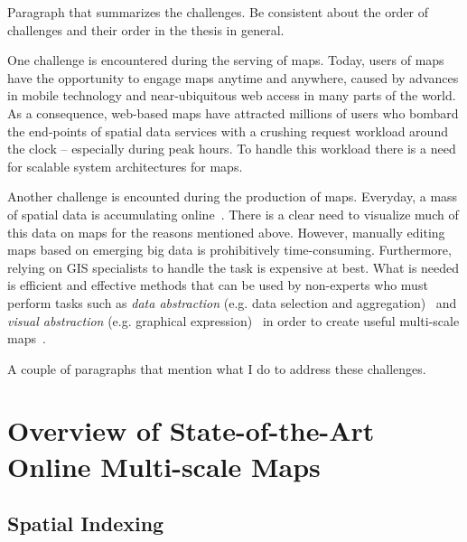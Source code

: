 \documentclass[11pt, oneside]{report}   	%
\begin{document}
Paragraph that summarizes the challenges. Be consistent about the order of challenges and their order in the thesis in general.

One challenge is encountered during the serving of maps. Today, users of maps have the opportunity to engage maps anytime and anywhere, caused by advances in mobile technology and near-ubiquitous web access in many parts of the world. As a consequence, web-based maps have attracted millions of users who bombard the end-points of spatial data services with a crushing request workload around the clock -- especially during peak hours. To handle this workload there is a need for scalable system architectures for maps. %

Another challenge is encounted during the production of maps. Everyday, a mass of spatial data is accumulating online~\cite{agrawal2012bigdata}. There is a clear need to visualize much of this data on maps for the reasons mentioned above. However, manually editing maps based on emerging big data is prohibitively time-consuming. Furthermore, relying on GIS specialists to handle the task is expensive at best. What is needed is efficient and effective methods that can be used by non-experts who must perform tasks such as \emph{data abstraction} (e.g. data selection and aggregation)~\cite{haunert2006landcover,schmid2013opensciencemap} and \emph{visual abstraction} (e.g. graphical expression)~\cite{jacques1967semiologie} in order to create useful multi-scale maps~\cite{stolte2003multiscale,weibel1999generalising}. 

A couple of paragraphs that mention what I do to address these challenges. 


\section{Overview of State-of-the-Art Online Multi-scale Maps}
\subsection{Spatial Indexing}
\end{document}
